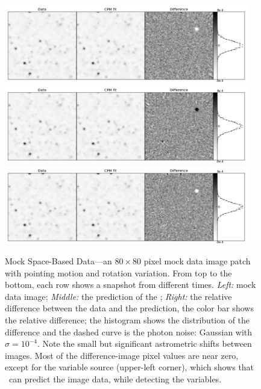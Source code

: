 \begin{figure}[p]
\begin{center}
\includegraphics[width=0.95\textwidth]{figures/cdi/f1a}
\includegraphics[width=0.95\textwidth]{figures/cdi/f1b}
\includegraphics[width=0.95\textwidth]{figures/cdi/f1c}
\end{center}
\caption{
\label{space}
  Mock Space-Based Data---an $80\times 80$ pixel mock data image patch with pointing motion and rotation variation. 
  From top to the bottom,  each row shows a snapshot from different times.
  \emph{Left:} mock data image;
  \emph{Middle:} the prediction of the \cpmdiff;
  \emph{Right:} the relative difference between the data and the prediction, the color bar shows the relative difference;
  the histogram shows the distribution of the difference and the dashed curve is the photon noise: Gaussian with $\sigma = 10^{-4}$.
  Note the small but significant astrometric shifts between images.
  Most of the difference-image pixel values are near zero, except for the variable source (upper-left corner), which shows that \cpmdiff\ can predict the image data, while detecting the variables. 
}
\end{figure}

